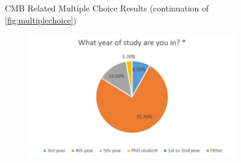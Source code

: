 \begin{figure}
\begin{subfigure}[h]{0.4\textwidth}
        \caption{}
        \label{fig:cmb-howto}
    \end{subfigure}
    \caption{CMB Related Multiple Choice Results (continuation of \ref{fig:multiplechoice})}
    \label{fig:oldmultiplechoice1}
\end{figure}

\begin{figure}
    \hspace*{-1.5cm}
    \begin{subfigure}[h]{0.4\textwidth}
        \includegraphics[width=1.5\textwidth, height=1.0\textwidth]{oldresults/participants.jpg}
        \caption{}
        \label{fig:distribution}
    \end{subfigure}
    \hfill
    \begin{subfigure}[h]{0.4\textwidth}

\end{subfigure}
\end{figure}
